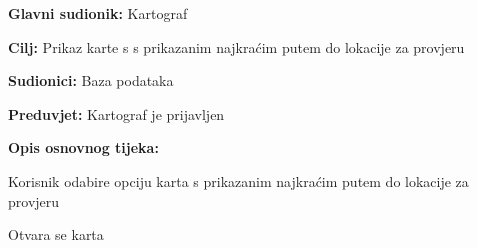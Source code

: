 					\noindent {}
					\begin{packed_item}
						
						\item \textbf{Glavni sudionik: }Kartograf
						\item  \textbf{Cilj:} Prikaz karte s s prikazanim najkraćim putem do lokacije za provjeru
						\item  \textbf{Sudionici:} Baza podataka
						\item  \textbf{Preduvjet:} Kartograf je prijavljen
						\item  \textbf{Opis osnovnog tijeka:}
						
						\item[] \begin{packed_enum}
							
							\item Korisnik odabire opciju karta s prikazanim najkraćim putem do lokacije za provjeru
							\item Otvara se karta
						\end{packed_enum}
					\end{packed_item}
					
